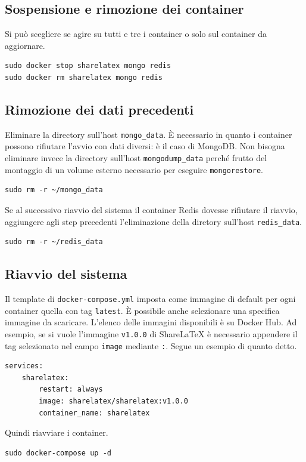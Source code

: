 \subsection{Sospensione e rimozione dei container}
Si può scegliere se agire su tutti e tre i container o solo sul container da aggiornare.
\begin{lstlisting}
sudo docker stop sharelatex mongo redis
sudo docker rm sharelatex mongo redis
\end{lstlisting}

\subsection{Rimozione dei dati precedenti}
Eliminare la directory sull'host \verb|mongo_data|. È necessario in quanto i container possono rifiutare l'avvio con dati diversi: è il caso di MongoDB. Non bisogna eliminare invece la directory sull'host \verb|mongodump_data| perché frutto del montaggio di un volume esterno necessario per eseguire \verb|mongorestore|.
\begin{lstlisting}
sudo rm -r ~/mongo_data
\end{lstlisting}
Se al successivo riavvio del sistema il container Redis dovesse rifiutare il riavvio, aggiungere agli step precedenti l'eliminazione della diretory sull'host \verb|redis_data|.
\begin{lstlisting}
sudo rm -r ~/redis_data
\end{lstlisting}

\subsection{Riavvio del sistema}
Il template di \verb|docker-compose.yml| imposta come immagine di default per ogni container quella con tag \verb|latest|. È possibile anche selezionare una specifica immagine da scaricare. L'elenco delle immagini disponibili è su Docker Hub. Ad esempio, se si vuole l'immagine \verb|v1.0.0| di ShareLaTeX è necessario appendere il tag selezionato nel campo \verb|image| mediante \verb|:|. Segue un esempio di quanto detto.
\begin{lstlisting}
services:
    sharelatex:
        restart: always
        image: sharelatex/sharelatex:v1.0.0
        container_name: sharelatex
\end{lstlisting}
Quindi riavviare i container.
\begin{lstlisting}
sudo docker-compose up -d
\end{lstlisting}

